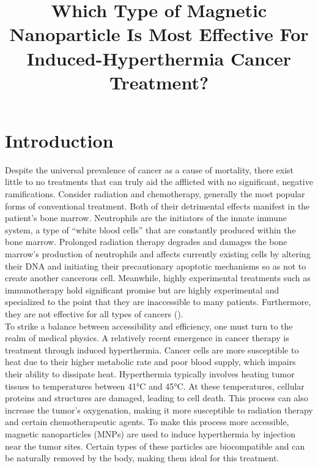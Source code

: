 \documentclass[12pt]{article}
\title{Which Type of Magnetic Nanoparticle Is Most Effective For Induced-Hyperthermia Cancer Treatment?}
\date{\LARGE{}}
\numberwithin{equation}{section}
\numberwithin{equation}{section}
\begin{document}
\maketitle
\section{Introduction}
Despite the universal prevalence of cancer as a cause of mortality, there exist little to no treatments that can truly aid the afflicted with no significant, negative ramifications. Consider radiation and chemotherapy, generally the most popular forms of conventional treatment. Both of their detrimental effects manifest in the patient's bone marrow. Neutrophils are the initiators of the innate immune system, a type of “white blood cells” that are constantly produced within the bone marrow. Prolonged radiation therapy degrades and damages the bone marrow’s production of neutrophils and affects currently existing cells by altering their DNA and initiating their precautionary apoptotic mechanisms so as not to create another cancerous cell. Meanwhile, highly experimental treatments such as immunotherapy hold significant promise but are highly experimental and specialized to the point that they are inaccessible to many patients. Furthermore, they are not effective for all types of cancers (\cite{immune}).\\
To strike a balance between accessibility and efficiency, one must turn to the realm of medical physics. A relatively recent emergence in cancer therapy is treatment through induced hyperthermia. Cancer cells are more susceptible to heat due to their higher metabolic rate and poor blood supply, which impairs their ability to dissipate heat. Hyperthermia typically involves heating tumor tissues to temperatures between 41°C and 45°C. At these temperatures, cellular proteins and structures are damaged, leading to cell death. This process can also increase the tumor's oxygenation, making it more susceptible to radiation therapy and certain chemotherapeutic agents. To make this process more accessible, magnetic nanoparticles (MNPs) are used to induce hyperthermia by injection near the tumor sites. Certain types of these particles are biocompatible and can be naturally removed by the body, making them ideal for this treatment. \\
\end{document}
